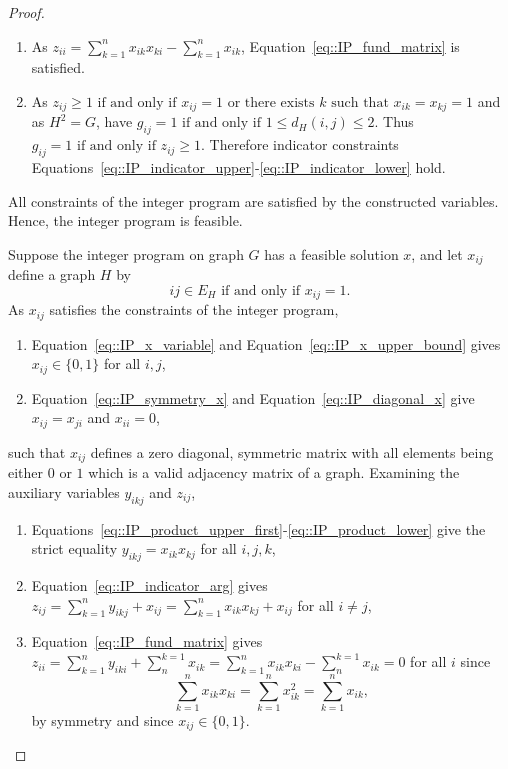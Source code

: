 \begin{proof}
\begin{enumerate}[label=\roman*)]
    \item As $\displaystyle z_{ii} = \sum_{k = 1}^{n} x_{ik}x_{ki} - \sum_{k = 1}^{n} x_{ik}$, Equation~\eqref{eq::IP_fund_matrix} is satisfied. 
    \item As $\displaystyle z_{ij} \geq 1 \text{ if and only if } x_{ij} = 1 \text{ or there exists } k \text{ such that } x_{ik}=x_{kj}= 1$ and as $H^2 = G$, have $g_{ij} = 1 \text{ if and only if } 1 \leq d_H(i,j) \leq 2$. Thus $g_{ij} = 1 \text{ if and only if } z_{ij} \geq 1$. Therefore indicator constraints Equations~\eqref{eq::IP_indicator_upper}-\eqref{eq::IP_indicator_lower} hold. 
  \end{enumerate}
  All constraints of the integer program are satisfied by the constructed variables. Hence, the integer program is feasible.

  Suppose the integer program on graph $G$ has a feasible solution $x$, and let $x_{ij}$ define a graph $H$ by 
  \[
  ij \in E_H \text{ if and only if } x_{ij} = 1. 
  \]
  As $x_{ij}$ satisfies the constraints of the integer program, 
  \begin{enumerate}[label=\roman*)]
    \item Equation~\eqref{eq::IP_x_variable} and Equation~\eqref{eq::IP_x_upper_bound} gives $x_{ij} \in \{0 , 1\}$ for all $i,j$,
    \item Equation~\eqref{eq::IP_symmetry_x} and Equation~\eqref{eq::IP_diagonal_x} give $x_{ij} = x_{ji}$ and $x_{ii} = 0$,
  \end{enumerate}
  such that $x_{ij}$ defines a zero diagonal, symmetric matrix with all elements being either $0$ or $1$ which is a valid adjacency matrix of a graph. 
  Examining the auxiliary variables $y_{ikj}$ and $z_{ij}$, 
  \begin{enumerate}[label=\roman*)]
    \item Equations~\eqref{eq::IP_product_upper_first}-\eqref{eq::IP_product_lower} give the strict equality $y_{ikj} = x_{ik}x_{kj}$ for all $i,j,k$,
    \item Equation~\eqref{eq::IP_indicator_arg} gives $\displaystyle z_{ij} = \sum_{k = 1}^{n}y_{ikj} + x_{ij} = \sum_{k = 1}^{n}x_{ik}x_{kj} + x_{ij}$ for all $i \neq j$,
    \item Equation~\eqref{eq::IP_fund_matrix} gives $\displaystyle z_{ii} = \sum_{k = 1}^{n}y_{iki} + \sum_{n}^{k = 1}x_{ik} = \sum_{k = 1}^{n} x_{ik}x_{ki} - \sum_{n}^{k = 1}x_{ik} = 0$ for all $i$ since
    \[
    \sum_{k = 1}^{n} x_{ik}x_{ki} = \sum_{k = 1}^{n} x_{ik}^2 = \sum_{k = 1}^{n} x_{ik},
    \]
    by symmetry and since $x_{ij} \in \{0 , 1\}$. 

\end{enumerate}
\end{proof}
